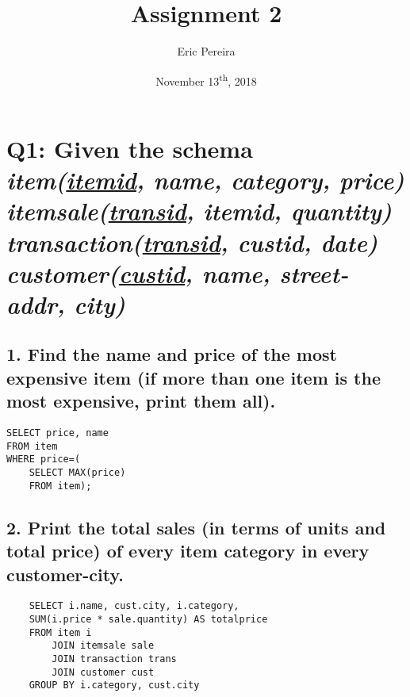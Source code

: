 \documentclass[12pt]{article}
\newcommand\tab[1][1cm]{\hspace*{#1}}
\begin{document}
	

\begin{titlepage}
	
\author{Eric Pereira}
\date{November 13\textsuperscript{th}, 2018}
\title{Assignment 2}

\maketitle

\end{titlepage}

\tableofcontents

\newpage {}

\section*{Q1: Given the schema\\ 
\tab \textit{item(\underline{itemid}, name, category, price)\\
\tab itemsale(\underline{transid}, itemid, quantity)\\ \tab transaction(\underline{transid}, custid, date) \\
\tab customer(\underline{custid}, name, street-addr, city)}}
%

\subsection*{1. Find the name and price of the most expensive item (if more than one item is the most expensive, print them all).}
%

\begin{lstlisting}
SELECT price, name
FROM item
WHERE price=(
	SELECT MAX(price) 
	FROM item);
\end{lstlisting}

\subsection*{2. Print the total sales (in terms of units and total price) of every item category in every customer-city.}
%

\begin{lstlisting}
	SELECT i.name, cust.city, i.category,
	SUM(i.price * sale.quantity) AS totalprice
	FROM item i 
		JOIN itemsale sale 
		JOIN transaction trans
		JOIN customer cust
	GROUP BY i.category, cust.city 
\end{lstlisting}
\end{document}
